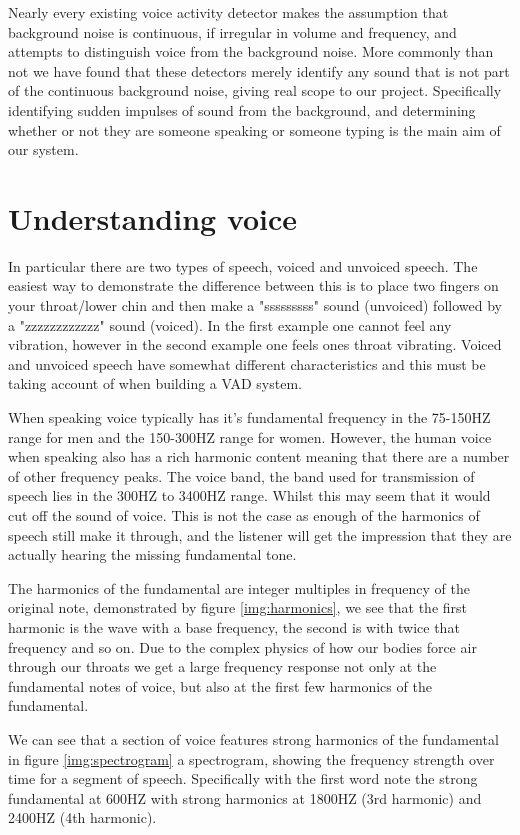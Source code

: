\documentclass[ %
                    author={Sam Phippen},
                supervisor={Dr. Rafal Bogacz},
                     title={Real time voice activity detectors in noisy personal computing environments},
                  subtitle={},
                    degree={MEng},
                      year={2012} ]{thesis}
\begin{document}
Nearly every existing voice activity detector makes the assumption that
background noise is continuous, if irregular in volume and frequency, and
attempts to distinguish voice from the background noise. More commonly than not
we have found that these detectors merely identify any sound that is not part
of the continuous background noise, giving real scope to our project.
Specifically identifying sudden impulses of sound from the background, and
determining whether or not they are someone speaking or someone typing is the
main aim of our system.

\section{Understanding voice}

In particular there are two types of speech, voiced and unvoiced speech. The
easiest way to demonstrate the difference between this is to place two fingers
on your throat/lower chin and then make a "sssssssss" sound (unvoiced) followed
by a "zzzzzzzzzzzz" sound (voiced). In the first example one cannot feel any
vibration, however in the second example one feels ones throat vibrating.
Voiced and unvoiced speech have somewhat different characteristics and this
must be taking account of when building a VAD system.

When speaking voice typically has it's fundamental frequency in the 75-150HZ
range for men and the 150-300HZ range for women. However, the human voice when
speaking also has a rich harmonic content meaning that there are a number of
other frequency peaks. The voice band, the band used for transmission of speech
lies in the 300HZ to 3400HZ range. Whilst this may seem that it would cut off
the sound of voice. This is not the case as enough of the harmonics of speech
still make it through, and the listener will get the impression that they are
actually hearing the missing fundamental tone.

The harmonics of the fundamental are integer multiples in frequency of the
original note, demonstrated by figure \ref{img:harmonics}, we see that the
first harmonic is the wave with a base frequency, the second is with twice that
frequency and so on. Due to the complex physics of how our bodies force air through
our throats we get a large frequency response not only at the fundamental notes
of voice, but also at the first few harmonics of the fundamental.

We can see that a section of voice features strong harmonics of the fundamental
in figure \ref{img:spectrogram} a spectrogram, showing the frequency strength
over time for a segment of speech. Specifically with the first word note the
strong fundamental at 600HZ with strong harmonics at 1800HZ (3rd harmonic) and
2400HZ (4th harmonic).
\end{document}
